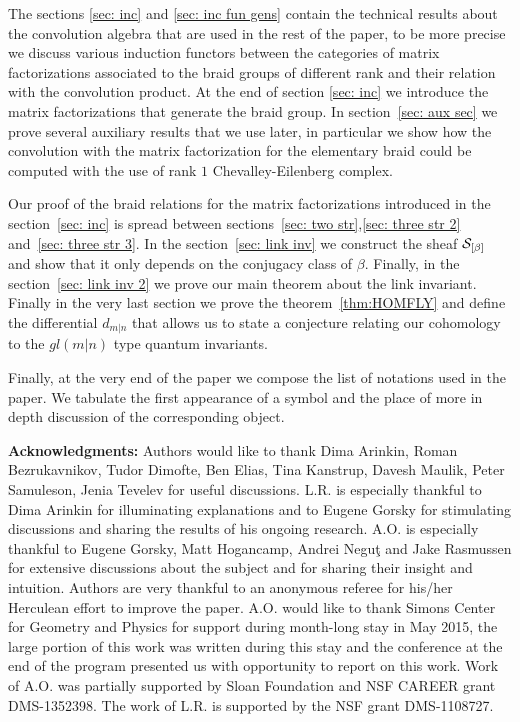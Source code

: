 \documentclass[10pt]{amsart}
\begin{document}
The sections \ref{sec: inc} and  \ref{sec: inc fun gens} contain the technical results about the convolution algebra that are used in the  rest of the paper, to be more precise we discuss various induction functors between the categories of matrix factorizations associated to the braid groups of different rank and
their relation with the convolution product.
 At the
end of section \ref{sec: inc} we introduce the matrix factorizations that generate the braid group. In section~\ref{sec: aux sec} we prove several auxiliary results that
we use later, in particular we show how the convolution with the matrix factorization for the elementary braid could be computed with the use of rank $1$ Chevalley-Eilenberg complex.

Our proof of the braid relations for the matrix factorizations introduced in the section~\ref{sec: inc} is spread between sections~\ref{sec: two str},\ref{sec: three str 2} and~\ref{sec: three str 3}.
In the section~\ref{sec: link inv} we construct the sheaf $\mathcal{S}_{[\beta]}$ and show that it only depends on the conjugacy class of $\beta$.
Finally, in the section~\ref{sec: link inv 2} we prove our main theorem about the link invariant. Finally in the very last section we prove the theorem~\ref{thm:HOMFLY} and define the differential
$d_{m|n}$ that allows us to state a conjecture relating our cohomology to the $gl(m|n)$ type quantum invariants.

Finally, at the very end of the paper we compose the list of notations used in the paper. We tabulate the first appearance of a symbol and the place of more in depth
discussion of the corresponding object.

{\bf Acknowledgments:} Authors would like to thank Dima Arinkin, Roman Bezrukavnikov, Tudor Dimofte, Ben Elias,  Tina Kanstrup, Davesh Maulik, Peter Samuleson, Jenia Tevelev for useful discussions. L.R. is especially thankful to Dima Arinkin for illuminating explanations and to Eugene Gorsky for stimulating discussions and sharing the results of his ongoing research.  A.O. is especially thankful to Eugene Gorsky, Matt Hogancamp, Andrei Negu\c{t} and
Jake Rasmussen for extensive discussions about  the subject and for sharing their insight and intuition.
Authors are very thankful to an anonymous referee for his/her Herculean effort to improve the paper.
A.O. would like to thank Simons Center for Geometry and Physics for support during month-long stay in May 2015, the large portion of this work
was written during this stay and the conference at the end of the program presented us with opportunity to report on this work.
Work of A.O. was partially supported by Sloan Foundation and NSF CAREER grant DMS-1352398. The work of L.R. is supported by the NSF grant DMS-1108727.
\end{document}
